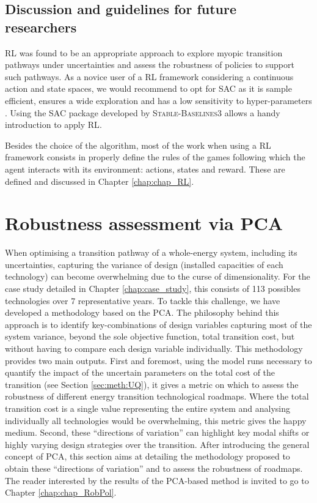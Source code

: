 \subsection{Discussion and guidelines for future researchers}
\label{subsec:meth:RL:discussion}
\acrfull{RL} was found to be an appropriate approach to explore myopic transition pathways under uncertainties and assess the robustness of policies to support such pathways. As a novice user of a \gls{RL} framework considering a continuous action and state spaces, we would recommend to opt for \gls{SAC} as it is sample efficient, ensures a wide exploration and has a low sensitivity to hyper-parameters \cite{haarnoja2018soft}. Using the \gls{SAC} package developed by \textsc{Stable-Baselines3} allows a handy introduction to apply \gls{RL}. 

Besides the choice of the algorithm, most of the work when using a \gls{RL} framework consists in properly define the rules of the games following which the agent interacts with its environment: actions, states and reward. These are defined and discussed in Chapter \ref{chap:chap_RL}.

\section{Robustness assessment via PCA}
\label{sec:meth:PCA}
When optimising a transition pathway of a whole-energy system, including its uncertainties, capturing the variance of design (\ie installed capacities of each technology) can become overwhelming due to the curse of dimensionality. For the case study detailed in Chapter \ref{chap:case_study}, this consists of 113 possibles technologies over 7 representative years. To tackle this challenge, we have developed a methodology based on the \acrfull{PCA}. The philosophy behind this approach is to identify key-combinations of design variables capturing most of the system variance, beyond the sole objective function, \ie total transition cost, but without having to compare each design variable individually. This methodology provides two main outputs. First and foremost, using the model runs necessary to quantify the impact of the uncertain parameters on the total cost of the transition (see Section \ref{sec:meth:UQ}), it gives a metric on which to assess the robustness of different energy transition technological roadmaps. Where the total transition cost is a single value representing the entire system and analysing individually all technologies would be overwhelming, this metric gives the happy medium. Second, these ``directions of variation'' can highlight key modal shifts or highly varying design strategies over the transition. After introducing the general concept of \gls{PCA}, this section aims at detailing the methodology proposed to obtain these ``directions of variation'' and to assess the robustness of roadmaps. The reader interested by the results of the \gls{PCA}-based method is invited to go to Chapter \ref{chap:chap_RobPol}.

